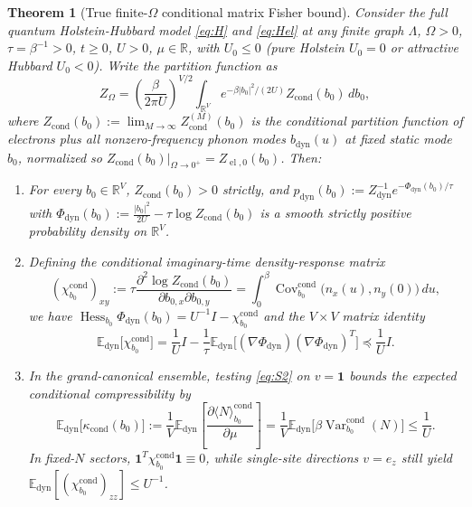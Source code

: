 \documentclass[11pt]{article}
\newtheorem{theorem}{Theorem}[section]
\theoremstyle{definition}
\theoremstyle{remark}
\DeclareMathOperator{\Var}{Var}
\DeclareMathOperator{\Cov}{Cov}
\DeclareMathOperator{\Hess}{Hess}
\DeclareMathOperator{\cond}{cond}
\DeclareMathOperator{\dyn}{dyn}
\DeclareMathOperator{\el}{el}
\newcommand{\E}{\mathbb{E}}
\newcommand{\R}{\mathbb{R}}
\begin{document}
\begin{theorem}[True finite-$\Omega$ conditional matrix Fisher bound]
\label{thm:S2}
Consider the full quantum Holstein-Hubbard model \eqref{eq:H} and \eqref{eq:Hel} at any finite graph $\Lambda$, $\Omega > 0$, $\tau = \beta^{-1} > 0$, $t \ge 0$, $U > 0$, $\mu \in \R$, with $U_0 \le 0$ (pure Holstein $U_0 = 0$ or attractive Hubbard $U_0 < 0$). Write the partition function as
\begin{equation}
Z_\Omega = \left(\frac{\beta}{2\pi U}\right)^{V/2} \int_{\R^V} e^{-\beta |b_0|^2/(2U)} Z_{\cond}(b_0)\,db_0,
\label{eq:ZOmega_split}
\end{equation}
where $Z_{\cond}(b_0) := \lim_{M\to\infty} Z_{\cond}^{(M)}(b_0)$ is the conditional partition function of electrons plus all nonzero-frequency phonon modes $b_{\dyn}(u)$ at fixed static mode $b_0$, normalized so $Z_{\cond}(b_0)\big|_{\Omega\to 0^+} = Z_{\el,0}(b_0)$. Then:
\begin{enumerate}[label=(\roman*),leftmargin=2.2em]
\item For every $b_0 \in \R^V$, $Z_{\cond}(b_0) > 0$ strictly, and $p_{\dyn}(b_0) := Z_{\dyn}^{-1} e^{-\Phi_{\dyn}(b_0)/\tau}$ with $\Phi_{\dyn}(b_0) := \frac{|b_0|^2}{2U} - \tau \log Z_{\cond}(b_0)$ is a smooth strictly positive probability density on $\R^V$.
\item Defining the conditional imaginary-time density-response matrix
\begin{equation}
(\chi_{b_0}^{\cond})_{xy} := \tau \frac{\partial^2 \log Z_{\cond}(b_0)}{\partial b_{0,x}\partial b_{0,y}} = \int_0^\beta \Cov_{b_0}^{\cond}\bigl(n_x(u), n_y(0)\bigr)\,du,
\label{eq:chicond}
\end{equation}
we have $\Hess_{b_0}\Phi_{\dyn}(b_0) = U^{-1} I - \chi_{b_0}^{\cond}$ and the $V \times V$ matrix identity
\begin{equation}
\E_{\dyn}\bigl[\chi_{b_0}^{\cond}\bigr] = \frac{1}{U} I - \frac{1}{\tau} \E_{\dyn}\bigl[(\nabla \Phi_{\dyn})(\nabla\Phi_{\dyn})^T\bigr] \preceq \frac{1}{U} I.
\label{eq:S2}
\end{equation}
\item In the grand-canonical ensemble, testing \eqref{eq:S2} on $v = \mathbf{1}$ bounds the expected conditional compressibility by
\begin{equation}
\E_{\dyn}\bigl[\kappa_{\cond}(b_0)\bigr] := \frac{1}{V} \E_{\dyn}\!\left[\frac{\partial \langle N \rangle_{b_0}^{\cond}}{\partial \mu}\right] = \frac{1}{V} \E_{\dyn}\bigl[\beta \Var_{b_0}^{\cond}(N)\bigr] \le \frac{1}{U}.
\label{eq:S2_comp}
\end{equation}
In fixed-$N$ sectors, $\mathbf{1}^T \chi_{b_0}^{\cond} \mathbf{1} \equiv 0$, while single-site directions $v = e_z$ still yield $\E_{\dyn}[(\chi_{b_0}^{\cond})_{zz}] \le U^{-1}$.
\end{enumerate}
\end{theorem}
\end{document}
